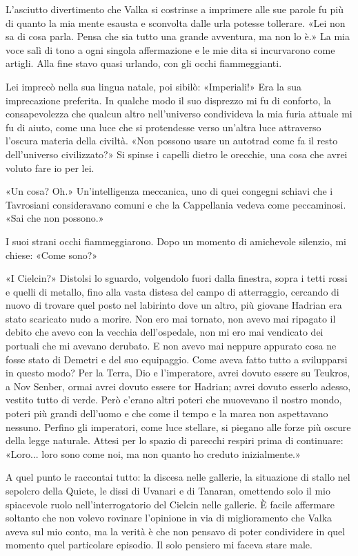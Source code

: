 L'asciutto divertimento che Valka si costrinse a imprimere alle sue
parole fu più di quanto la mia mente esausta e sconvolta dalle urla
potesse tollerare. «Lei non sa di cosa parla. Pensa che sia tutto una
grande avventura, ma non lo è.» La mia voce salì di tono a ogni singola
affermazione e le mie dita si incurvarono come artigli. Alla fine stavo
quasi urlando, con gli occhi fiammeggianti.

Lei imprecò nella sua lingua natale, poi sibilò: «Imperiali!» Era la sua
imprecazione preferita. In qualche modo il suo disprezzo mi fu di
conforto, la consapevolezza che qualcun altro nell'universo condivideva
la mia furia attuale mi fu di aiuto, come una luce che si protendesse
verso un'altra luce attraverso l'oscura materia della civiltà. «Non
possono usare un autotrad come fa il resto dell'universo civilizzato?»
Si spinse i capelli dietro le orecchie, una cosa che avrei voluto fare
io per lei.

«Un cosa? Oh.» Un'intelligenza meccanica, uno di quei congegni schiavi
che i Tavrosiani consideravano comuni e che la Cappellania vedeva come
peccaminosi. «Sai che non possono.»

I suoi strani occhi fiammeggiarono. Dopo un momento di amichevole
silenzio, mi chiese: «Come sono?»

«I Cielcin?» Distolsi lo sguardo, volgendolo fuori dalla finestra, sopra
i tetti rossi e quelli di metallo, fino alla vasta distesa del campo di
atterraggio, cercando di nuovo di trovare quel posto nel labirinto dove
un altro, più giovane Hadrian era stato scaricato nudo a morire. Non ero
mai tornato, non avevo mai ripagato il debito che avevo con la vecchia
dell'ospedale, non mi ero mai vendicato dei portuali che mi avevano
derubato. E non avevo mai neppure appurato cosa ne fosse stato di
Demetri e del suo equipaggio. Come aveva fatto tutto a svilupparsi in
questo modo? Per la Terra, Dio e l'imperatore, avrei dovuto essere su
Teukros, a Nov Senber, ormai avrei dovuto essere tor Hadrian; avrei
dovuto esserlo adesso, vestito tutto di verde. Però c'erano altri poteri
che muovevano il nostro mondo, poteri più grandi dell'uomo e che come il
tempo e la marea non aspettavano nessuno. Perfino gli imperatori, come
luce stellare, si piegano alle forze più oscure della legge naturale.
Attesi per lo spazio di parecchi respiri prima di continuare: «Loro...
loro sono come noi, ma non quanto ho creduto inizialmente.»

A quel punto le raccontai tutto: la discesa nelle gallerie, la
situazione di stallo nel sepolcro della Quiete, le dissi di Uvanari e di
Tanaran, omettendo solo il mio spiacevole ruolo nell'interrogatorio del
Cielcin nelle gallerie. È facile affermare soltanto che non volevo
rovinare l'opinione in via di miglioramento che Valka aveva sul mio
conto, ma la verità è che non pensavo di poter condividere in quel
momento quel particolare episodio. Il solo pensiero mi faceva stare
male.

